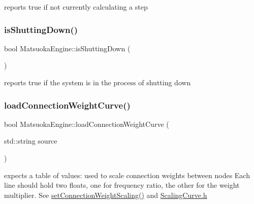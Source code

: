 reports true if not currently calculating a step 

\mbox{\label{classMatsuokaEngine_a5d7bb7f68eb7338a6c34eef10d421f68}} 
\subsubsection{\texorpdfstring{is\+Shutting\+Down()}{isShuttingDown()}}
{\footnotesize\ttfamily bool Matsuoka\+Engine\+::is\+Shutting\+Down (\begin{DoxyParamCaption}{ }\end{DoxyParamCaption})}



reports true if the system is in the process of shutting down 

\mbox{\label{classMatsuokaEngine_ae2ad27d38196e2217bdb0b5da35fd095}} 
\subsubsection{\texorpdfstring{load\+Connection\+Weight\+Curve()}{loadConnectionWeightCurve()}\hspace{0.1cm}{\footnotesize\ttfamily [1/2]}}
{\footnotesize\ttfamily bool Matsuoka\+Engine\+::load\+Connection\+Weight\+Curve (\begin{DoxyParamCaption}\item[{std\+::string}]{source }\end{DoxyParamCaption})}

expects a table of values\+: used to scale connection weights between nodes Each line should hold two floats, one for frequency ratio, the other for the weight multiplier. See \mbox{\hyperlink{classMatsuokaEngine_adb864bf26563682f94ba2e131fb8b793}{set\+Connection\+Weight\+Scaling()}} and \mbox{\hyperlink{ScalingCurve_8h}{Scaling\+Curve.\+h}} \mbox{\label{classMatsuokaEngine_ad05eb51876bee90334426757a981139b}} 
